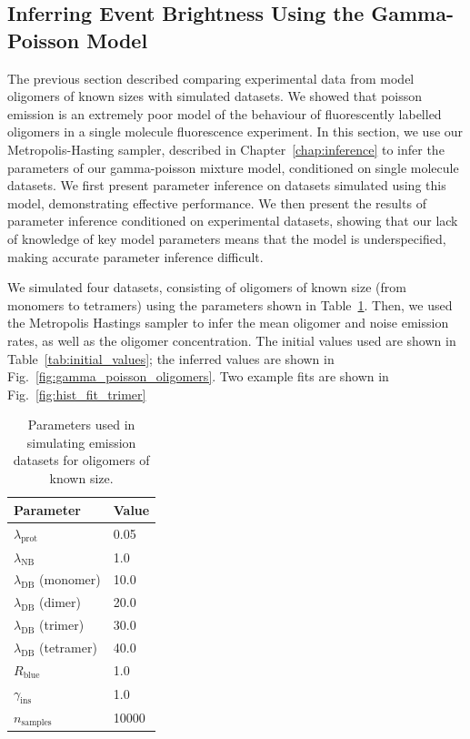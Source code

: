 \clearpage

\subsection{Inferring Event Brightness Using the Gamma-Poisson Model}
The previous section described comparing experimental data from model oligomers of known sizes with simulated datasets. We showed that poisson emission is an extremely poor model of the behaviour of fluorescently labelled oligomers in a single molecule fluorescence experiment. In this section, we use our Metropolis-Hasting sampler, described in Chapter~\autoref{chap:inference} to infer the parameters of our gamma-poisson mixture model, conditioned on single molecule datasets. We first present parameter inference on datasets simulated using this model, demonstrating effective performance. We then present the results of parameter inference conditioned on experimental datasets, showing that our lack of knowledge of key model parameters means that the model is underspecified, making accurate parameter inference difficult.

We simulated four datasets, consisting of oligomers of known size (from monomers to tetramers) using the parameters shown in Table~\ref{tab:oligomer_params}. Then, we used the Metropolis Hastings sampler to infer the mean oligomer and noise emission rates, as well as the oligomer concentration. The initial values used are shown in Table~\ref{tab:initial_values}; the inferred values are shown in Fig.~\ref{fig:gamma_poisson_oligomers}. Two example fits are shown in Fig.~\ref{fig:hist_fit_trimer}

\begin{center}
\begin{table}[!ht]
\caption{Parameters used in simulating emission datasets for oligomers of known size.}
\begin{tabular}{|l|l|}
\hline
{\bf Parameter} & {\bf Value}\\ \hline
$\lambda_{\text{prot}}$ & 0.05\\
$\lambda_{\text{NB}}$ & 1.0\\
$\lambda_{\text{DB}}$ (monomer) & 10.0\\
$\lambda_{\text{DB}}$ (dimer) & 20.0\\
$\lambda_{\text{DB}}$ (trimer) & 30.0\\
$\lambda_{\text{DB}}$ (tetramer) & 40.0\\
$R_{\text{blue}}$ & 1.0\\
$\gamma_{\text{ins}}$ & 1.0\\
$n_{\text{samples}}$ & 10000\\ \hline
\end{tabular}
\label{tab:oligomer_params}
\end{table}
\end{center}

